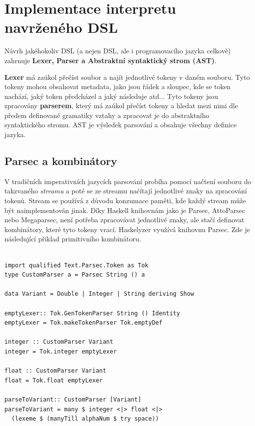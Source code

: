 \documentclass[male,czech]{kithesis}
\begin{document}

\chapter{Implementace interpretu navrženého DSL}

Návrh jakéhokoliv DSL (a nejen DSL, ale i programovacího jazyka celkově) zahrnuje
\textbf{Lexer, Parser a Abstraktní syntaktický strom (AST)}.

\textbf{Lexer} má zaúkol přečíst soubor a najít jednotlivé tokeny v daném souboru.
Tyto tokeny mohou obsahovat metadata, jako jsou řádek a sloupec, kde se token nachází,
jaký token předcházel a jaký následuje atd... Tyto tokeny jsou zpracovány \textbf{parserem}, 
který má zaúkol přečíst tokeny a hledat mezi nimi dle předem definované gramatiky vztahy 
a zpracovat je do abstraktního syntaktického stromu. AST je výsledek
parsování a obsahuje všechny definice jazyka.

\section{Parsec a kombinátory}

V tradičních imperativních jazycích parsování probíha pomocí načtení souboru 
do takzvaného \textit{streamu} a 
poté se ze streamu načítají jednotlivé znaky na zpracování tokenů. 
Stream se používá z důvodu konzumace paměti, 
kde každý stream může být naimplementován jinak.
Díky Haskell knihovnám jako je Parsec, 
AttoParsec nebo Megaparsec,
není potřeba zpracovávat jednotlivé znaky, 
ale stačí definovat kombinátory, 
které tyto tokeny vrací. 
Haskelyzer využívá knihovnu Parsec. 
Zde je následující přiklad primitivního kombinátoru.

\begin{verbatim}

import qualified Text.Parsec.Token as Tok
type CustomParser a = Parsec String () a

data Variant = Double | Integer | String deriving Show

emptyLexer:: Tok.GenTokenParser String () Identity
emptyLexer = Tok.makeTokenParser Tok.emptyDef

integer :: CustomParser Variant 
integer = Tok.integer emptyLexer 

float :: CustomParser Variant 
float = Tok.float emptyLexer 

parseToVariant:: CustomParser [Variant]
parseToVariant = many $ integer <|> float <|> 
  (lexeme $ (manyTill alphaNum $ try space))

\end{verbatim}
\end{document}
